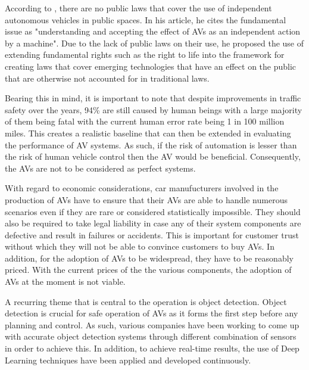 According to \cite{gasser2016fundamental}, there are no public laws that cover the  use of independent autonomous vehicles in public spaces. In his article, he cites the fundamental issue as "understanding and accepting the effect of AVs as an independent action by a machine". Due to the lack of public laws on their use, he proposed the use of extending fundamental rights such as the right to life into the framework for creating laws that cover emerging technologies that have an effect on the public that are otherwise not accounted for in traditional laws. 

Bearing this in mind, it is important to note that despite improvements in traffic safety over the years, 94\% are still caused by human beings with a large majority of them being fatal with the current human error rate being 1 in 100 million miles. This creates a realistic baseline that can then be extended in evaluating the performance of AV systems. As such, if the risk of automation is lesser than the risk of human vehicle control then the AV would be beneficial. Consequently, the AVs are not to be considered as perfect systems.

With regard to economic considerations, car manufucturers involved in the production of AVs have to ensure that their AVs are able to handle numerous scenarios even if they are rare or considered statistically impossible. They should also be required to take legal liability in case any of their system components are defective and result in failures or accidents. This is important for customer trust without which they will not be able to convince customers to buy AVs. In addition, for the adoption of AVs to be widespread, they have to be reasonably priced. With the current prices of the the various components, the adoption of AVs at the moment is not viable. 



A recurring theme that is central to the operation is object detection. Object detection is crucial for safe operation of AVs as it forms the first step before any planning and control. As such, various companies have been working to come up with accurate object detection systems through different combination of sensors in order to achieve this. In addition, to achieve real-time results, the use of Deep Learning techniques have been applied and developed continuously. 



